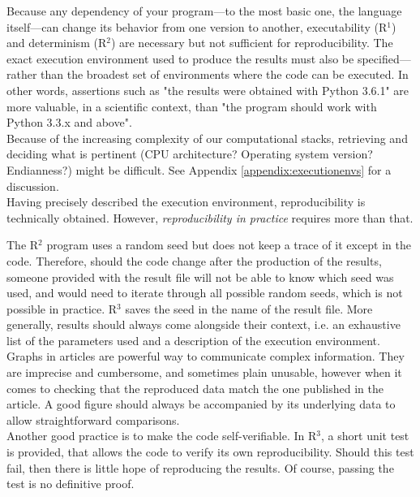 \documentclass[a4paper,11pt]{article}
\begin{document}
Because any dependency of your program---to the most basic one, the language itself---can change its behavior from one version to another, executability (R$^1$) and determinism (R$^2$) are necessary but not sufficient for reproducibility. The exact execution environment used to produce the results must also be specified---rather than the broadest set of environments where the code can be executed. In other words, assertions such as "the results were obtained with Python 3.6.1" are more valuable, in a scientific context, than "the program should work with Python 3.3.x and above".\\

Because of the increasing complexity of our computational stacks, retrieving and deciding what is pertinent (CPU architecture? Operating system version? Endianness?) might be difficult.
See Appendix \ref{appendix:executionenvs} for a discussion.\\

Having precisely described the execution environment, reproducibility is technically obtained. However, \emph{reproducibility in practice} requires more than that.

The R$^2$ program uses a random seed but does not keep a trace of it except in the code. Therefore, should the code change after the production of the results, someone provided with the result file will not be able to know which seed was used, and would need to iterate through all possible random seeds, which is not possible in practice. R$^3$ saves the seed in the name of the result file. More generally, results should always come alongside their context, i.e. an exhaustive list of the parameters used and a description of the execution environment.\\

Graphs in articles are powerful way to communicate complex information. They are imprecise and cumbersome, and sometimes plain unusable, however when it comes to checking that the reproduced data match the one published in the article. A good figure should always be accompanied by its underlying data to allow straightforward comparisons.\\

Another good practice is to make the code self-verifiable. In R$^3$, a short unit test is provided, that allows the code to verify its own reproducibility. Should this test fail, then there is little hope of reproducing the results. Of course, passing the test is no definitive proof.\\
\end{document}
